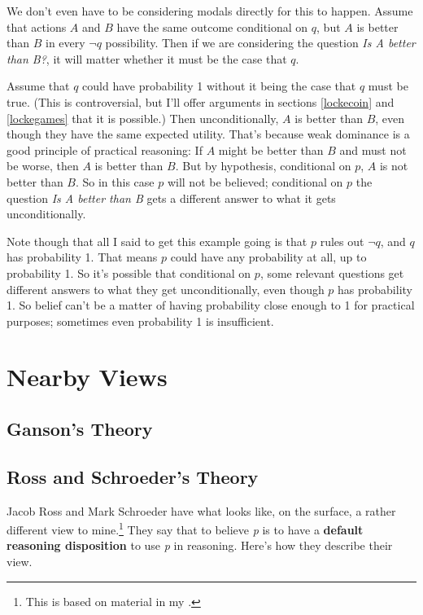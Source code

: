 \documentclass[11pt,]{book}
\let\rmarkdownfootnote\footnote%
\def\footnote{\protect\rmarkdownfootnote}
\begin{document}
We don't even have to be considering modals directly for this to happen. Assume that actions \(A\) and \(B\) have the same outcome conditional on \(q\), but \(A\) is better than \(B\) in every \(\neg q\) possibility. Then if we are considering the question \emph{Is A better than B?}, it will matter whether it must be the case that \(q\).

Assume that \(q\) could have probability 1 without it being the case that \(q\) must be true. (This is controversial, but I'll offer arguments in sections \ref{lockecoin} and \ref{lockegames} that it is possible.) Then unconditionally, \(A\) is better than \(B\), even though they have the same expected utility. That's because weak dominance is a good principle of practical reasoning: If \(A\) might be better than \(B\) and must not be worse, then \(A\) is better than \(B\). But by hypothesis, conditional on \(p\), \(A\) is not better than \(B\). So in this case \(p\) will not be believed; conditional on \(p\) the question \emph{Is A better than B} gets a different answer to what it gets unconditionally.

Note though that all I said to get this example going is that \(p\) rules out \(\neg q\), and \(q\) has probability 1. That means \(p\) could have any probability at all, up to probability 1. So it's possible that conditional on \(p\), some relevant questions get different answers to what they get unconditionally, even though \(p\) has probability 1. So belief can't be a matter of having probability close enough to 1 for practical purposes; sometimes even probability 1 is insufficient.

\hypertarget{nearby-views}{%
\section{Nearby Views}\label{nearby-views}}

\hypertarget{ganson}{%
\subsection{Ganson's Theory}\label{ganson}}

\hypertarget{usc}{%
\subsection{Ross and Schroeder's Theory}\label{usc}}

Jacob Ross and Mark Schroeder \citeyearpar{RossSchroeder2014} have what looks like, on the surface, a rather different view to mine.\footnote{This is based on material in my \citeyearpar[sect. 3]{Weatherson2016}.} They say that to believe \emph{p} is to have a \textbf{default reasoning disposition} to use \emph{p} in reasoning. Here's how they describe their view.
\end{document}
